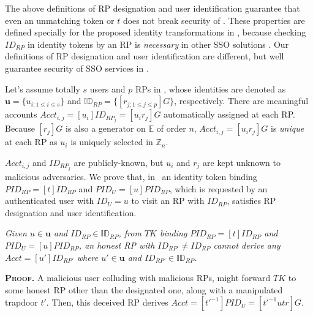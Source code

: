 
The above definitions of RP designation and user identification guarantee that
even an unmatching token or $t$ does not break security of \usso.
These properties are defined specially for the proposed identity transformations in \usso,
    because checking $ID_{RP}$ in identity tokens by an RP is \emph{necessary} in other SSO solutions \cite{OpenIDConnect,BrowserID,SPRESSO,NIST2017draft,POIDC,save-flow,miso}.
Our definitions of RP designation and user identification are different,
    but well guarantee security of SSO services in \usso.

Let's assume totally $s$ users and $p$ RPs in \usso,
    whose identities are denoted as $\mathbf{u} = \{u_{i; 1 \leq i \leq s}\}$ and $\mathbb{ID}_{RP} = \{[r_{j;1 \leq j \leq p}]G\}$, respectively.
There are meaningful accounts $Acct_{i,j}=[u_i]ID_{RP_j} = [u_i r_j]G$ automatically assigned at each RP.
Because $[r_j]G$ is also a generator on $\mathbb{E}$ of order $n$,
    $Acct_{i,j}=[u_i r_j]G$ is \emph{unique} at each RP as $u_i$ is uniquely selected in $\mathbb{Z}_n$.

$Acct_{i,j}$ and $ID_{RP_j}$ are publicly-known, but $u_{i}$ and $r_{j}$ are kept unknown to malicious adversaries.
We prove that, in \usso\ 
an identity token binding $PID_{RP} = [t]ID_{RP}$ and $PID_U = [u]PID_{RP}$, which is requested by an authenticated user with $ID_U =u$ to visit an RP with $ID_{RP}$,
    satisfies RP designation and user identification.

\begin{thm}[RP Designation]
\emph{Given $u \in \mathbf{u}$ and $ID_{RP} \in \mathbb{ID}_{RP}$,
from $TK$ binding $PID_{RP}=[t]ID_{RP}$ and $PID_U = [u]PID_{RP}$,
    an honest RP with ${ID_{RP'} \neq ID_{RP}}$ cannot derive any $Acct = [u']ID_{RP'}$ where $u' \in \mathbf{u}$ and $ID_{RP'} \in \mathbb{ID}_{RP}$.}\label{thm-rp-designation}
\label{thm-rp-des}
\end{thm}

\noindent\textbf{\textsc{Proof.}} 
A malicious user colluding with malicious RPs,
    might forward $TK$ to some honest RP other than the designated one,
        along with a manipulated trapdoor $t'$.
Then, this deceived RP derives $Acct = [t'^{-1}]PID_U = [t'^{-1}utr]G$.

